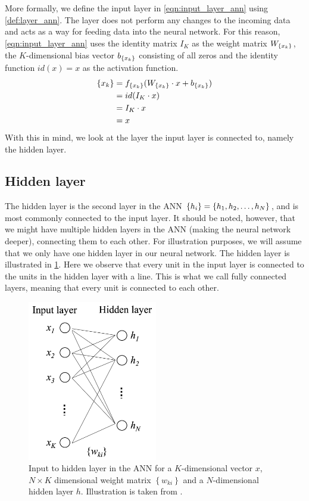More formally, we define the input layer in \cref{eqn:input_layer_ann} using \cref{def:layer_ann}. The layer does not perform any changes to the incoming data and acts as a way for feeding data into the neural network. For this reason, \cref{eqn:input_layer_ann} uses the identity matrix $I_K$ as the weight matrix $W_{\left\{ {x}_{k} \right\}}$, the $K$-dimensional bias vector $b_{\left\{ {x}_{k} \right\}}$ consisting of all zeros and the identity function $id(x)=x$ as the activation function.
\begin{align}
    \label{eqn:input_layer_ann}
    \left\{ {x}_{k} \right\}
    &= f_{\left\{ {x}_{k} \right\}}(W_{\left\{ {x}_{k} \right\}} \cdot x + b_{\left\{ {x}_{k} \right\}}) \\
    &= id(I_K \cdot x) \\
    &= I_K \cdot x \\
    &= x
\end{align}
With this in mind, we look at the layer the input layer is connected to, namely the hidden layer.

\subsection{Hidden layer}
The hidden layer is the second layer in the ANN $\left\{ {h}_{i} \right\} = \left\{ h_1, h_2, \ldots, h_N \right\}$, and is most commonly connected to the input layer. It should be noted, however, that we might have multiple hidden layers in the ANN (making the neural network deeper), connecting them to each other. For illustration purposes, we will assume that we only have one hidden layer in our neural network. The hidden layer is illustrated in \cref{fig:hidden_layer_ann}. Here we observe that every unit in the input layer is connected to the units in the hidden layer with a line. This is what we call fully connected layers, meaning that every unit is connected to each other.

\begin{figure}[H]
    \centering
    \includegraphics[height=7cm]{thesis/figures/ann-input-hidden-layer-rong-2014.png}
    \caption{Input to hidden layer in the ANN for a $K$-dimensional vector $x$, $N\times K$ dimensional weight matrix $\left\{ w_{ki} \right\}$ and a $N$-dimensional hidden layer $h$. Illustration is taken from \cite[Figure 6]{rong2016word2vec}.}
    \label{fig:hidden_layer_ann}
\end{figure}

